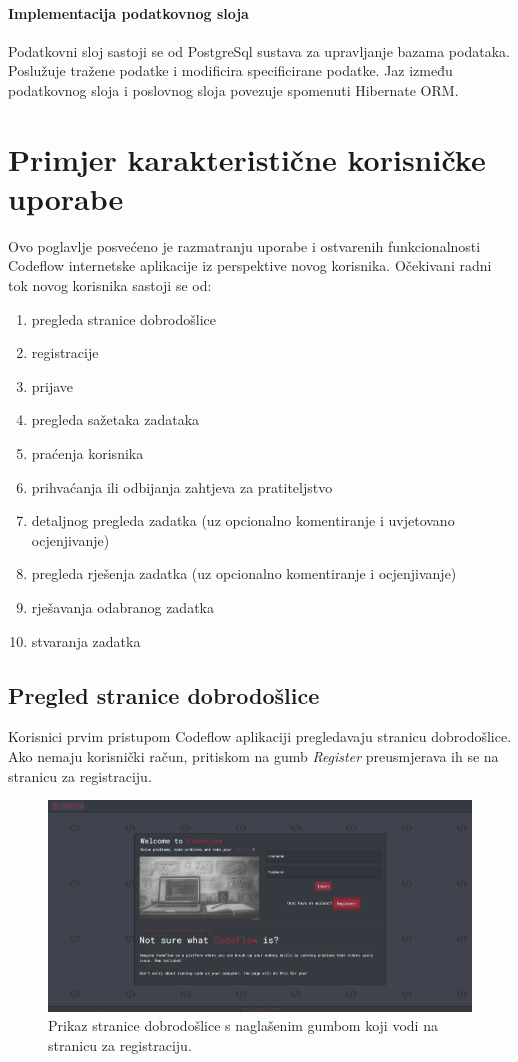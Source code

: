 \documentclass[times, utf8, zavrsni]{fer}
\begin{document}
			\subsubsection{Implementacija podatkovnog sloja}
			Podatkovni sloj sastoji se od PostgreSql sustava za upravljanje bazama podataka. Poslužuje tražene podatke i modificira specificirane podatke. Jaz između podatkovnog sloja i poslovnog sloja povezuje spomenuti Hibernate ORM.
			
	\chapter{Primjer karakteristične korisničke uporabe}
	Ovo poglavlje posvećeno je razmatranju uporabe i ostvarenih funkcionalnosti Codeflow internetske aplikacije iz perspektive novog korisnika. Očekivani radni tok novog korisnika sastoji se od:
	\begin{enumerate}
		\item pregleda stranice dobrodošlice
		\item registracije
		\item prijave
		\item pregleda sažetaka zadataka
		\item praćenja korisnika
		\item prihvaćanja ili odbijanja zahtjeva za pratiteljstvo
		\item detaljnog pregleda zadatka (uz opcionalno komentiranje i uvjetovano ocjenjivanje)
		\item pregleda rješenja zadatka (uz opcionalno komentiranje i ocjenjivanje)
		\item rješavanja odabranog zadatka
		\item stvaranja zadatka
	\end{enumerate}

		\section{Pregled stranice dobrodošlice}
		Korisnici prvim pristupom Codeflow aplikaciji pregledavaju stranicu dobrodošlice. Ako nemaju korisnički račun, pritiskom na gumb \textit{Register} preusmjerava ih se na stranicu za registraciju.
		\begin{figure}[htb]
			\centering
			\includegraphics[width=\linewidth]{pictures/koristenje/StranicaDobrodoslice.png}
			\caption{Prikaz stranice dobrodošlice s naglašenim gumbom koji vodi na stranicu za registraciju.}
			\label{fig:welcome}
		\end{figure}
	
\end{document}
